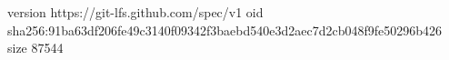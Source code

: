 version https://git-lfs.github.com/spec/v1
oid sha256:91ba63df206fe49c3140f09342f3baebd540e3d2aec7d2cb048f9fe50296b426
size 87544
